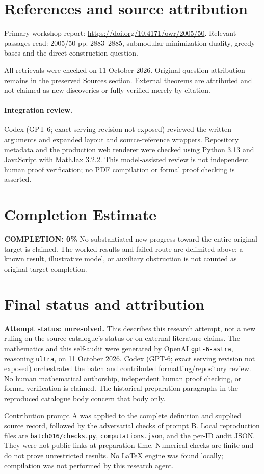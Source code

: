 \documentclass[11pt]{article}
\begin{document}
\section{References and source attribution}
Primary workshop report: \url{https://doi.org/10.4171/owr/2005/50}. Relevant passages read: 2005/50 pp. 2883--2885, submodular minimization duality, greedy bases and the direct-construction question.

All retrievals were checked on 11 October 2026. Original question attribution remains in the preserved Sources section. External theorems are attributed and not claimed as new discoveries or fully verified merely by citation.


\paragraph{Integration review.} Codex (GPT-6; exact serving revision not exposed) reviewed the written arguments and expanded layout and source-reference wrappers. Repository metadata and the production web renderer were checked using Python 3.13 and JavaScript with MathJax 3.2.2. This model-assisted review is not independent human proof verification; no PDF compilation or formal proof checking is asserted.

\section{Completion Estimate}
\noindent\textbf{COMPLETION: 0\%}
No substantiated new progress toward the entire original target is claimed. The worked results and failed route are delimited above; a known result, illustrative model, or auxiliary obstruction is not counted as original-target completion.

\section{Final status and attribution}
\textbf{Attempt status: unresolved.} This describes this research attempt, not a new ruling on the source catalogue's status or on external literature claims.
The mathematics and this self-audit were generated by OpenAI \texttt{gpt-6-astra}, reasoning \texttt{ultra}, on 11 October 2026. Codex (GPT-6; exact serving revision not exposed) orchestrated the batch and contributed formatting/repository review. No human mathematical authorship, independent human proof checking, or formal verification is claimed. The historical preparation paragraphs in the reproduced catalogue body concern that body only.

Contribution prompt A was applied to the complete definition and supplied source record, followed by the adversarial checks of prompt B. Local reproduction files are \texttt{batch016/checks.py}, \texttt{computations.json}, and the per-ID audit JSON. They were not public links at preparation time. Numerical checks are finite and do not prove unrestricted results. No LaTeX engine was found locally; compilation was not performed by this research agent.
\end{document}
